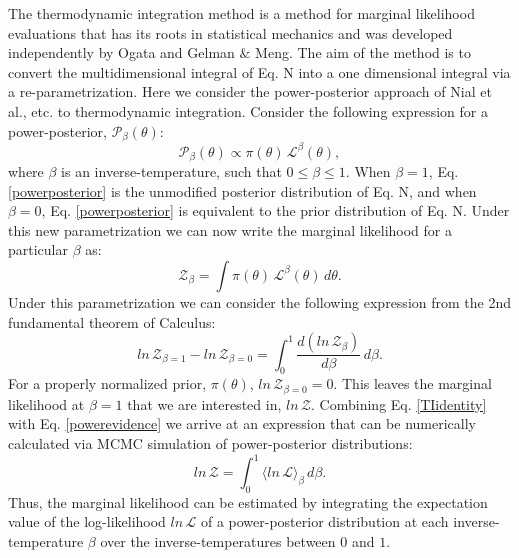 The thermodynamic integration method is a method for marginal likelihood evaluations that has its roots in statistical mechanics and was developed independently by Ogata and Gelman $\&$ Meng. The aim of the method is to convert the multidimensional integral of Eq. N into a one dimensional integral via a re-parametrization. Here we consider the power-posterior approach of Nial et al., etc. to thermodynamic integration. Consider the following expression for a power-posterior, $\mathcal{P}_\beta (\theta)$:
\begin{equation}\label{powerposterior}
    \mathcal{P}_\beta \left(\theta \right) \propto \pi\left(\theta \right) \, \mathcal{L}^\beta \left(\theta \right),
\end{equation}
where $\beta$ is an inverse-temperature, such that $0 \leq \beta \leq 1$. When $\beta = 1$, Eq. \ref{powerposterior} is the unmodified posterior distribution of Eq. N, and when $\beta = 0$, Eq. \ref{powerposterior} is equivalent to the prior distribution of Eq. N. Under this new parametrization we can now write the marginal likelihood for a particular $\beta$ as:
\begin{equation}\label{powerevidence}
    \mathcal{Z}_\beta = \int \pi \left(\theta\right) \, \mathcal{L}^\beta \left(\theta \right) \, d\theta.
\end{equation}
Under this parametrization we can consider the following expression from the 2nd fundamental theorem of Calculus:
\begin{equation}\label{TIidentity}
    ln \, \mathcal{Z}_{\beta=1} - ln \, \mathcal{Z}_{\beta=0} = \int^1_0 \frac{d\left(ln \, \mathcal{Z}_\beta \right)}{d\beta} \, d\beta.
\end{equation}
For a properly normalized prior, $\pi\left(\theta \right)$, $ln \, \mathcal{Z}_{\beta=0} = 0$. This leaves the marginal likelihood at $\beta=1$ that we are interested in, $ln \, \mathcal{Z}$. Combining Eq. \ref{TIidentity} with Eq. \ref{powerevidence} we arrive at an expression that can be numerically calculated via MCMC simulation of power-posterior distributions:
\begin{equation}\label{TIeq}
    ln \, \mathcal{Z} = \int^1_0 \langle ln \, \mathcal{L} \rangle_\beta \, d\beta.
\end{equation}
Thus, the marginal likelihood can be estimated by integrating the expectation value of the log-likelihood $ln \, \mathcal{L}$ of a power-posterior distribution at each inverse-temperature $\beta$ over the inverse-temperatures between $0$ and $1$.

